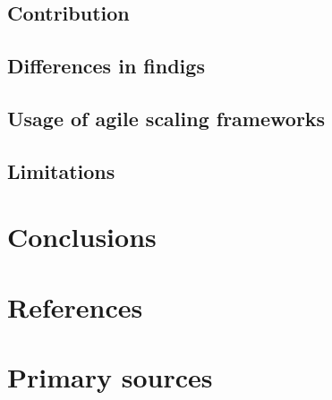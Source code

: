 \documentclass{article}
\begin{document}
\subsection{Contribution}

\subsection{Differences in findigs}

\subsection{Usage of agile scaling frameworks}

\subsection{Limitations}

\section{Conclusions}


\section{References}

\section{Primary sources}

\end{document}
